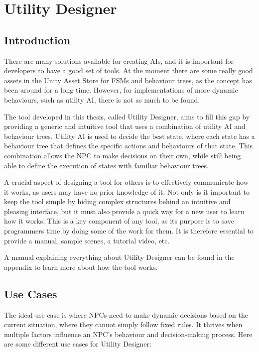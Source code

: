 \chapter{Utility Designer}
\label{chap:utilitydesigner}
\section{Introduction}
\label{sec:utilitydesigner_introduction}

There are many solutions available for creating AIs, and it is important for developers to have a good set of tools. At the moment there are some really good assets in the Unity Asset Store for FSMs and behaviour trees, as the concept has been around for a long time. However, for implementations of more dynamic behaviours, such as utility AI, there is not as much to be found.

The tool developed in this thesis, called Utility Designer, aims to fill this gap by providing a generic and intuitive tool that uses a combination of utility AI and behaviour trees. Utility AI is used to decide the best state, where each state has a behaviour tree that defines the specific actions and behaviours of that state. This combination allows the NPC to make decisions on their own, while still being able to define the execution of states with familiar behaviour trees.

A crucial aspect of designing a tool for others is to effectively communicate how it works, as users may have no prior knowledge of it. Not only is it important to keep the tool simple by hiding complex structures behind an intuitive and pleasing interface, but it must also provide a quick way for a new user to learn how it works. This is a key component of any tool, as its purpose is to save programmers time by doing some of the work for them. It is therefore essential to provide a manual, sample scenes, a tutorial video, etc.

A manual explaining everything about Utility Designer can be found in the appendix to learn more about how the tool works.

\section{Use Cases}
\label{sec:utilitydesigner_usecases}

The ideal use case is where NPCs need to make dynamic decisions based on the current situation, where they cannot simply follow fixed rules. It thrives when multiple factors influence an NPC's behaviour and decision-making process. Here are some different use cases for Utility Designer:

